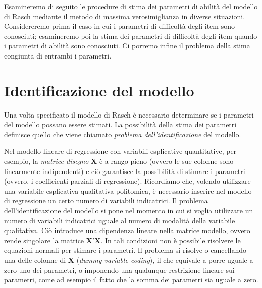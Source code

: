 Esamineremo di seguito le procedure di stima dei parametri di abilità del modello di Rasch mediante il metodo di massima verosimiglianza in diverse situazioni. Considereremo prima il caso in cui i parametri di difficoltà degli item sono conosciuti; esamineremo poi la stima dei parametri di difficoltà degli item quando i parametri di abilità sono conosciuti. Ci porremo infine il problema della stima congiunta di entrambi i parametri.

\section{Identificazione del modello}\label{identificazione}

Una volta specificato il modello di Rasch è necessario determinare se
i parametri del modello possano essere stimati.  La possibilità della
stima dei parametri definisce quello che viene chiamato {\it problema dell'identificazione} del modello.  

Nel modello lineare di regressione con variabili esplicative
quantitative, per esempio, la {\it matrice disegno} $\boldsymbol{X}$ è
a rango pieno (ovvero le sue colonne sono linearmente indipendenti) e
ciò garantisce la possibilità di stimare i parametri (ovvero, i
coefficienti parziali di regressione). Ricordiamo che, volendo utilizzare una variabile esplicativa qualitativa politomica, è necessario inserire nel modello di regressione un certo
numero di variabili indicatrici.  Il problema dell'identificazione del
modello si pone nel momento in cui si voglia utilizzare un numero di
variabili indicatrici uguale al numero di modalità della variabile
qualitativa.  Ciò introduce una dipendenza lineare nella matrice
modello, ovvero rende singolare la matrice $\boldsymbol{X'X}$. In tali condizioni non è possibile risolvere le equazioni normali per stimare i parametri.  Il
problema si risolve o cancellando una delle colonne di
$\boldsymbol{X}$ ({\it dummy variable coding}), il che equivale a
porre uguale a zero uno dei parametri, o imponendo una qualunque
restrizione lineare sui parametri, come ad esempio il fatto che la
somma dei parametri sia uguale a zero.

